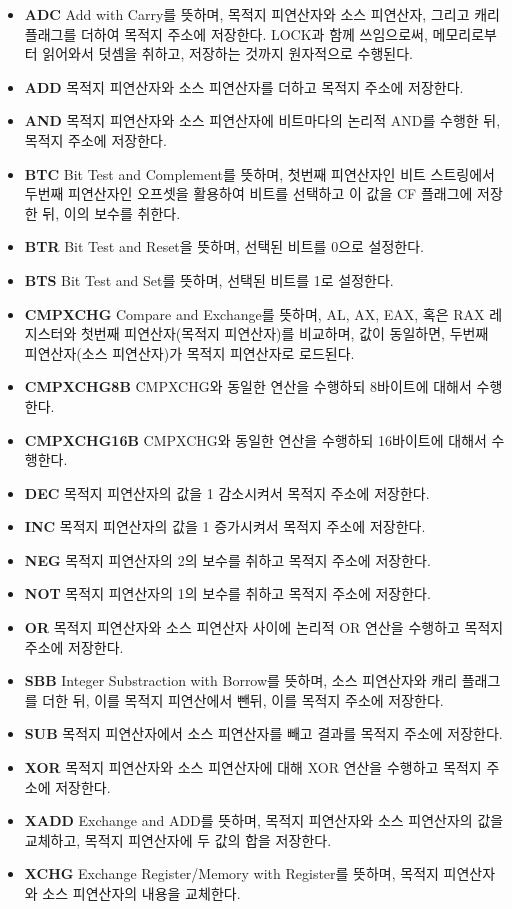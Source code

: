 \documentclass[11pt, a4paper]{article}
\begin{document}
\begin{itemize}
	\item \textbf{ADC} Add with Carry를 뜻하며, 목적지 피연산자와 소스 피연산자, 그리고 캐리 플래그를 더하여 목적지 주소에 저장한다. LOCK과 함께 쓰임으로써, 메모리로부터 읽어와서 덧셈을 취하고, 저장하는 것까지 원자적으로 수행된다.
	\item \textbf{ADD} 목적지 피연산자와 소스 피연산자를 더하고 목적지 주소에 저장한다. 
	\item \textbf{AND} 목적지 피연산자와 소스 피연산자에 비트마다의 논리적 AND를 수행한 뒤, 목적지 주소에 저장한다.
	\item \textbf{BTC} Bit Test and Complement를 뜻하며, 첫번째 피연산자인 비트 스트링에서 두번째 피연산자인 오프셋을 활용하여 비트를 선택하고 이 값을 CF 플래그에 저장한 뒤, 이의 보수를 취한다.
	\item \textbf{BTR} Bit Test and Reset을 뜻하며, 선택된 비트를 0으로 설정한다.
	\item \textbf{BTS} Bit Test and Set를 뜻하며, 선택된 비트를 1로 설정한다.
	\item \textbf{CMPXCHG} Compare and Exchange를 뜻하며, AL, AX, EAX, 혹은 RAX 레지스터와 첫번째 피연산자(목적지 피연산자)를 비교하며, 값이 동일하면, 두번째 피연산자(소스 피연산자)가 목적지 피연산자로 로드된다.
	\item \textbf{CMPXCHG8B} CMPXCHG와 동일한 연산을 수행하되 8바이트에 대해서 수행한다.
	\item \textbf{CMPXCHG16B} CMPXCHG와 동일한 연산을 수행하되 16바이트에 대해서 수행한다.
	\item \textbf{DEC} 목적지 피연산자의 값을 1 감소시켜서 목적지 주소에 저장한다.
	\item \textbf{INC} 목적지 피연산자의 값을 1 증가시켜서 목적지 주소에 저장한다.
	\item \textbf{NEG} 목적지 피연산자의 2의 보수를 취하고 목적지 주소에 저장한다.
	\item \textbf{NOT} 목적지 피연산자의 1의 보수를 취하고 목적지 주소에 저장한다.
	\item \textbf{OR} 목적지 피연산자와 소스 피연산자 사이에 논리적 OR 연산을 수행하고 목적지 주소에 저장한다.
	\item \textbf{SBB} Integer Substraction with Borrow를 뜻하며, 소스 피연산자와 캐리 플래그를 더한 뒤, 이를 목적지 피연산에서 뺀뒤, 이를 목적지 주소에 저장한다.
	\item \textbf{SUB} 목적지 피연산자에서 소스 피연산자를 빼고 결과를 목적지 주소에 저장한다.
	\item \textbf{XOR} 목적지 피연산자와 소스 피연산자에 대해 XOR 연산을 수행하고 목적지 주소에 저장한다.
	\item \textbf{XADD} Exchange and ADD를 뜻하며, 목적지 피연산자와 소스 피연산자의 값을 교체하고, 목적지 피연산자에 두 값의 합을 저장한다.
	\item \textbf{XCHG} Exchange Register/Memory with Register를 뜻하며, 목적지 피연산자와 소스 피연산자의 내용을 교체한다. 
\end{itemize}
\end{document}
